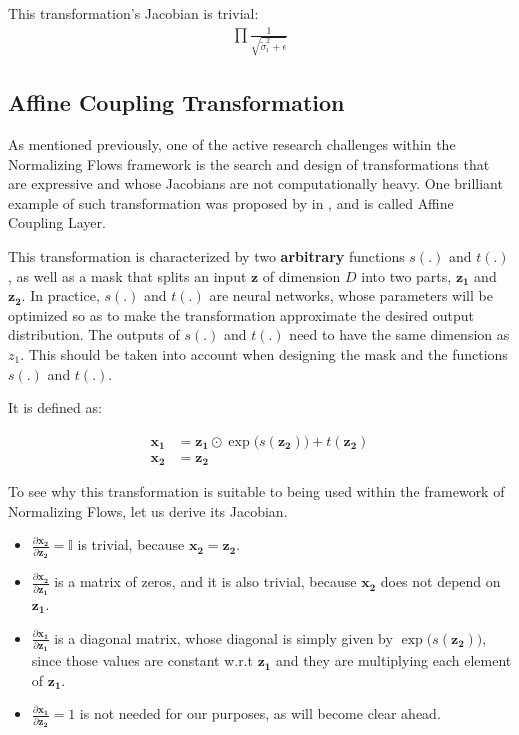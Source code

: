 This transformation's Jacobian is trivial: 
\begin{align}
    \prod \frac{1}{\sqrt{{\tilde\sigma}_i^2 + \epsilon}}
\end{align}

\subsection{Affine Coupling Transformation}
As mentioned previously, one of the active research challenges within the
Normalizing Flows framework is the search and design of transformations that
are expressive and whose Jacobians are not computationally heavy. One brilliant
example of such transformation was proposed by \cite{author:real-nvp} in
\cite{real-nvp}, and is called Affine Coupling Layer.

This transformation is characterized by two \textbf{arbitrary} functions $s(.)$ and
$t(.)$, as well as a mask that splits an input $\mathbf{z}$ of dimension $D$ into
two parts, $\mathbf{z_1}$ and $\mathbf{z_2}$. In practice, $s(.)$ and $t(.)$ are
neural networks, whose parameters will be optimized so as to make the transformation
approximate the desired output distribution. The outputs of $s(.)$ and $t(.)$
need to have the same dimension as $z_1$. This should be taken into account when
designing the mask and the functions $s(.)$ and $t(.)$.

It is defined as:

\begin{align}
    \mathbf{x_1} &= \mathbf{z_1} \odot \exp\big(s(\mathbf{z_2})\big) + t(\mathbf{z_2}) \\
    \mathbf{x_2} &= \mathbf{z_2}
\end{align}

To see why this transformation is suitable to being used within the framework
of Normalizing Flows, let us derive its Jacobian.
\begin{itemize}
    \item $\frac{\partial \mathbf{x_2}}{\partial \mathbf{z_2}} = \mathbb{I}$ is trivial, because $\mathbf{x_2} = \mathbf{z_2}$.
    \item $\frac{\partial \mathbf{x_2}}{\partial \mathbf{z_1}}$ is a matrix of zeros, and it is also
        trivial, because $\mathbf{x_2}$ does not depend on $\mathbf{z_1}$.
    \item $\frac{\partial \mathbf{x_1}}{\partial \mathbf{z_1}}$ is a diagonal matrix,
        whose diagonal is simply given by $\exp\big(s(\mathbf{z_2})\big)$, since those values are
        constant w.r.t $\mathbf{z_1}$ and they are multiplying each element of $\mathbf{z_1}$.
    \item $\frac{\partial \mathbf{x_1}}{\partial \mathbf{z_2}} = 1$ is not needed for our purposes,
        as will become clear ahead.
\end{itemize}

